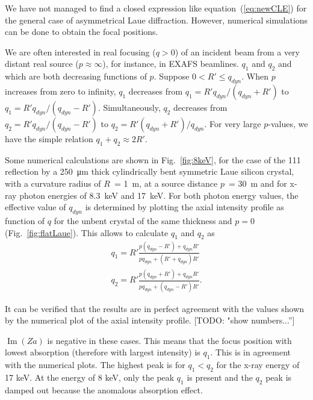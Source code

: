 \documentclass[preprint]{iucr}              %
\newcommand{\todo}[1]{{\color{red}[TODO: "#1'']}}
\newcommand{\inred}[1]{{\color{red}#1}}
\begin{document}
\inred{We have not managed to find a closed expression like equation~(\ref{eq:newCLE}) for the general case of asymmetrical Laue diffraction. However, numerical simulations can be done to obtain the focal positions. }

We are often interested in real focusing ($q>0$) of an incident beam from a very distant real source ($p\approx \infty$), for instance, in EXAFS beamlines. $q_1$ and $q_2$ and which are both decreasing functions of $p$. Suppose $0<R'\le q_{dyn}$. When $p$ increases from zero to infinity, $q_1$ decreases from $q_1=R'q_{dyn}/(q_{dyn}+R')$ to $q_1=R'q_{dyn}/(q_{dyn}-R')$. Simultaneously, $q_2$ decreases from $q_2=R'q_{dyn}/(q_{dyn}-R')$ to $q_2=R'(q_{dyn}+R')/q_{dyn}$. For very large $p$-values, we have the simple relation $q_1+q_2\approx 2R'$.

Some numerical calculations are shown in Fig.~\ref{fig:8keV}, for the case of the 111 reflection by a \SI{250}{\micro\meter} thick cylindrically bent symmetric Laue silicon crystal, with a curvature radius of $R$~= \SI{1}{\meter}, at a source distance $p$~= \SI{30}{\meter} and for x-ray photon energies of 8.3~keV and 17~keV. 
For both photon energy values, the effective value of $q_{dyn}$ is determined by plotting the axial intensity profile as function of $q$ for the unbent crystal of the same thickness and $p=0$ (Fig.~\ref{fig:flatLaue}). This allows to calculate $q_1$ and $q_2$ as
\begin{multline}
\label{eq:q1andq2}
q_1 = R' \frac{p(q_{dyn}-R')+q_{dyn}R'}{p q_{dyn}+(R'+q_{dyn})R'} \\
q_2 = R' \frac{p(q_{dyn}+R')+q_{dyn}R'}{p q_{dyn}+(q_{dyn}-R')R'}.
\end{multline}

It can be verified that the results are in perfect agreement with the values shown by the numerical plot of the axial intensity profile. \todo{show numbers...}
 
$\operatorname{Im}(Za)$ is negative in these cases. This means that the focus position with lowest absorption (therefore with largest intensity) is $q_1$. This is in agreement with the numerical plots. 
The highest peak is for $q_1<q_2$ for the x-ray energy of 17 keV. At the energy of 8 keV, only the  peak $q_1$ is present and the $q_2$ peak is damped out because the anomalous absorption effect.
\end{document}
